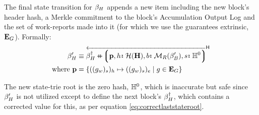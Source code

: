 The final state transition for $\beta_H$ appends a new item including the new block's header hash, a Merkle commitment to the block's Accumulation Output Log and the set of work-reports made into it (for which we use the guarantees extrinsic, $\mathbf{E}_G$). Formally:
\begin{equation}
  \begin{aligned}
    \recenthistory' &\equiv {\overleftarrow{\recenthistory^\dagger \doubleplus \tup{
      \mathbf{p},
      \is{h}{\hash(\mathbf{H})},
      \is{b}{\mathcal{M}_R(\beefybelt')},
      \is{s}{\H^0}
      }}}^\mathsf{H} \\
    \where \mathbf{p} &= \{ ((g_w)_s)_h \mapsto ((g_w)_s)_e \mid g \in \xtguarantees \}
  \end{aligned}
\end{equation}

The new state-trie root is the zero hash, $\mathbb{H}^0$, which is inaccurate but safe since $\beta_H'$ is not utilized except to define the next block's $\beta_H^\dagger$, which contains a corrected value for this, as per equation \ref{eq:correctlaststateroot}.
